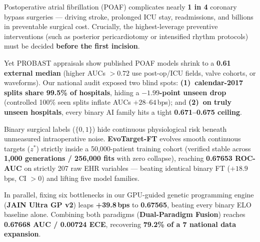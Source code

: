 \documentclass[8.8pt,letterpaper]{article}
\begin{document}
\noindent
\begin{minipage}[t]{0.486\textwidth}
  \vspace{0pt}
  {\fontsize{8.3}{10.3}\selectfont
  Postoperative atrial fibrillation (POAF) complicates nearly \textbf{1 in 4} coronary bypass surgeries --- driving stroke, prolonged ICU stay, readmissions, and billions in preventable surgical cost. Crucially, the highest-leverage preventive interventions (such as posterior pericardiotomy or intensified rhythm protocols) must be decided \textbf{before the first incision}.

  \vspace{2.5pt}
  Yet PROBAST appraisals show published POAF models shrink to a \textbf{0.61 external median} (higher AUCs $>0.72$ use post-op/ICU fields, valve cohorts, or waveforms). Our national audit exposed two blind spots: \textbf{(1)~calendar-2017 splits share 99.5\% of hospitals}, hiding a \textbf{$-1.99$-point unseen drop} (controlled 100\% seen splits inflate AUCs $+28$--$64$\,bps); and \textbf{(2)~on truly unseen hospitals}, every binary AI family hits a tight \textbf{0.671--0.675 ceiling}.
  }
\end{minipage}\hfill
\begin{minipage}[t]{0.486\textwidth}
  \vspace{0pt}
  {\fontsize{8.3}{10.3}\selectfont
  Binary surgical labels ($\{0, 1\}$) hide continuous physiological risk beneath unmeasured intraoperative noise. \textbf{EvoTarget-FT} evolves smooth continuous targets ($z^*$) strictly inside a 50,000-patient training cohort (verified stable across \textbf{1,000 generations / 256,000 fits} with zero collapse), reaching \textbf{0.67653 ROC-AUC} on strictly 207 raw EHR variables --- beating identical binary FT ($+18.9$\,bps, CI $>0$) and lifting five model families.

  \vspace{2.5pt}
  In parallel, fixing six bottlenecks in our GPU-guided genetic programming engine (\textbf{JAIN Ultra GP v2}) leaps \textbf{+39.8\,bps} to \textbf{0.67565}, beating every binary ELO baseline alone. Combining both paradigms (\textbf{Dual-Paradigm Fusion}) reaches \textbf{0.67668 AUC / 0.00724 ECE}, recovering \textbf{79.2\% of a 7\x{} national data expansion}.
  }
\end{minipage}
\end{document}
